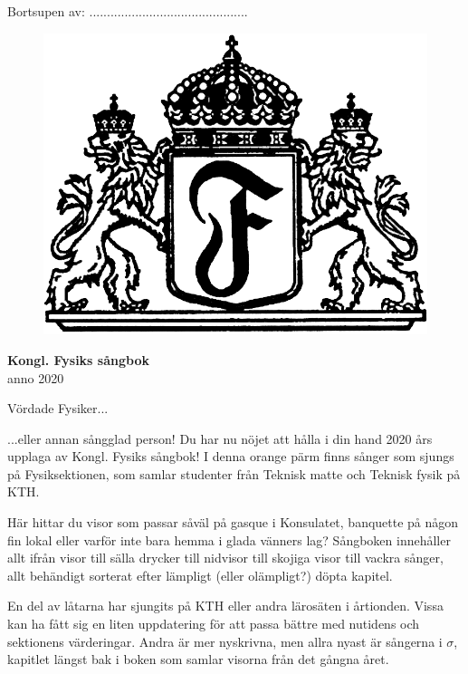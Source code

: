 \documentclass[a6paper,12pt]{article}
\begin{document}
\noindent Bortsupen av: .............................................
\vspace{50pt}
\begin{figure}[!h]
\centering
\includegraphics[width=\textwidth]{sangbok.png}
\end{figure}
\vspace{-20pt}
\begin{center}
\Huge\textbf{Kongl. Fysiks sångbok} \\
\Large anno 2020
\end{center}

\newpage
\setlength{\oddsidemargin}{-0.57in}
\noindent
\Large Vördade Fysiker... 

\footnotesize \noindent ...eller annan sångglad person! Du har nu nöjet att hålla i din hand 2020 års upplaga av Kongl. Fysiks sångbok! I denna orange pärm finns sånger som sjungs på Fysiksektionen, som samlar studenter från Teknisk matte och Teknisk fysik på KTH. 

Här hittar du visor som passar såväl på gasque i Konsulatet, banquette på någon fin lokal eller varför inte bara hemma i glada vänners lag? Sångboken innehåller allt ifrån visor till sälla drycker till nidvisor till skojiga visor till vackra sånger, allt behändigt sorterat efter lämpligt (eller olämpligt?) döpta kapitel. 

En del av låtarna har sjungits på KTH eller andra lärosäten i årtionden. Vissa kan ha fått sig en liten uppdatering för att passa bättre med nutidens och sektionens värderingar. Andra är mer nyskrivna, men allra nyast är sångerna i $\sigma$,  kapitlet längst bak i boken som samlar visorna från det gångna året.
\end{document}
